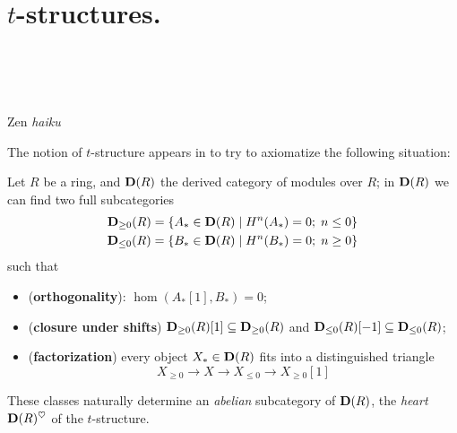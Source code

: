 \section{$t$\hyp{}structures.}\label{what.s.a.tee} 
\epigraph{%
\\
\\
\\
}{Zen \emph{haiku}}
The notion of $t$\hyp{}structure appears in \cite{BBDPervers} to try to axiomatize the following situation:
\begin{definition}\label{thecanonical}\index{}
Let $R$ be a ring, and $\mathbf{D}(R)$ the derived category of modules over $R$; in $\mathbf{D}(R)$ we can find two full subcategories
\begin{gather*}
\mathbf{D}_{\ge 0}(R) = \{  A_* \in \mathbf{D}(R) \mid H^n(A_*)=0;\; n\le 0 \}\\
\mathbf{D}_{\le 0}(R) = \{ B_* \in \mathbf{D}(R) \mid H^n(B_*)=0;\; n\ge 0 \}
\end{gather*}
such that
\begin{itemize}
\item (\textbf{orthogonality}): $\hom(A_*[1], B_*) = 0$;
\item (\textbf{closure under shifts}) $\mathbf{D}_{\ge 0}(R)[1]\subseteq \mathbf{D}_{\ge 0}(R)$ and $\mathbf{D}_{\le 0}(R)[-1]\subseteq \mathbf{D}_{\le 0}(R)$;
\item (\textbf{factorization}) every object $X_*\in \mathbf{D}(R)$ fits into a distinguished triangle
\[
X_{\ge 0} \longrightarrow X \longrightarrow X_{\le 0} \to X_{\ge 0}[1]
\]
\end{itemize}
\end{definition}
These classes naturally determine an \emph{abelian} subcategory of $\mathbf{D}(R)$, the \emph{heart} $\mathbf{D}(R)^\heartsuit$ of the $t$\hyp{}structure. 


